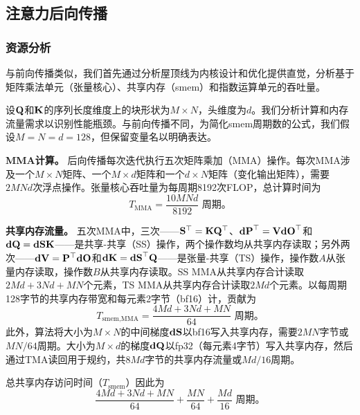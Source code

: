 \subsection{注意力后向传播}
\label{sec:bwd}

\subsubsection{资源分析}

与前向传播类似，我们首先通过分析屋顶线为内核设计和优化提供直觉，分析基于矩阵乘法单元（张量核心）、共享内存（smem）和指数运算单元的吞吐量。

设$\mathbf{Q}$和$\mathbf{K}$的序列长度维度上的块形状为$M \times N$，头维度为$d$。我们分析计算和内存流量需求以识别性能瓶颈。与前向传播不同，为简化smem周期数的公式，我们假设$M = N = d = 128$，但保留变量名以明确表达。

\noindent\textbf{MMA计算。}
后向传播每次迭代执行五次矩阵乘加（MMA）操作。每次MMA涉及一个$M \times N$矩阵、一个$M \times d$矩阵和一个$d \times N$矩阵（变化输出矩阵），需要$2MNd$次浮点操作。张量核心吞吐量为每周期8192次FLOP，总计算时间为
{\setlength{\abovedisplayskip}{2pt}%
 \setlength{\belowdisplayskip}{2pt}%
 \setlength{\abovedisplayshortskip}{2pt}%
 \setlength{\belowdisplayshortskip}{2pt}%
\begin{equation}
    T_{\text{MMA}} = \frac{10MNd}{8192} \text{ 周期。}
\end{equation}}

\noindent\textbf{共享内存流量。}
五次MMA中，三次——$\mathbf{S}^\top = \mathbf{K} \mathbf{Q}^\top$、$\mathbf{dP}^\top = \mathbf{V} \mathbf{dO}^\top$和$\mathbf{dQ} = \mathbf{dS} \mathbf{K}$——是共享-共享（SS）操作，两个操作数均从共享内存读取；另外两次——$\mathbf{dV} = \mathbf{P}^\top \mathbf{dO}$和$\mathbf{dK} = \mathbf{dS}^\top \mathbf{Q}$——是张量-共享（TS）操作，操作数$A$从张量内存读取，操作数$B$从共享内存读取。SS MMA从共享内存合计读取$2Md + 3Nd + MN$个元素，TS MMA从共享内存合计读取$2Md$个元素。以每周期128字节的共享内存带宽和每元素2字节（bf16）计，贡献为
{\setlength{\abovedisplayskip}{4pt}%
 \setlength{\belowdisplayskip}{4pt}%
 \setlength{\abovedisplayshortskip}{3pt}%
 \setlength{\belowdisplayshortskip}{3pt}%
\begin{equation}
    T_{\text{smem,MMA}} = \frac{4 M d + 3 N d + M N}{64} \text{ 周期。}
\end{equation}}
此外，算法将大小为$M \times N$的中间梯度$\mathbf{dS}$以bf16写入共享内存，需要$2MN$字节或$MN/64$周期。大小为$M \times d$的梯度$\mathbf{dQ}$以fp32（每元素4字节）写入共享内存，然后通过TMA读回用于规约，共$8Md$字节的共享内存流量或$Md/16$周期。

总共享内存访问时间（$T_{\text{smem}}$）因此为
{\setlength{\abovedisplayskip}{4pt}%
 \setlength{\belowdisplayskip}{4pt}%
 \setlength{\abovedisplayshortskip}{3pt}%
 \setlength{\belowdisplayshortskip}{3pt}%
\begin{equation}
    \frac{4 M d + 3 N d + M N}{64} + \frac{MN}{64} + \frac{Md}{16} \text{ 周期。}
\end{equation}}

